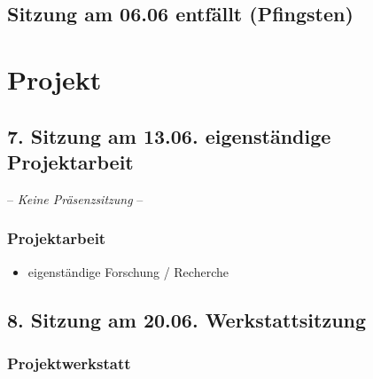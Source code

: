 \documentclass[
  ngerman,
]{article}
\providecommand{\tightlist}{%
  \setlength{\itemsep}{0pt}\setlength{\parskip}{0pt}}
\begin{document}
\hypertarget{sitzung-am-06.06-entfuxe4llt-pfingsten}{%
\subsection*{Sitzung am 06.06 entfällt (Pfingsten)}\label{sitzung-am-06.06-entfuxe4llt-pfingsten}}

\hypertarget{projekt}{%
\section*{Projekt}\label{projekt}}

\hypertarget{sitzung-am-13.06.-eigenstuxe4ndige-projektarbeit}{%
\subsection*{7. Sitzung am 13.06. \textbar{} eigenständige Projektarbeit}\label{sitzung-am-13.06.-eigenstuxe4ndige-projektarbeit}}

-- \emph{Keine Präsenzsitzung} --

\hypertarget{projektarbeit-5}{%
\subsubsection*{Projektarbeit}\label{projektarbeit-5}}

\begin{itemize}
\tightlist
\item
  eigenständige Forschung / Recherche
\end{itemize}

\hypertarget{sitzung-am-20.06.-werkstattsitzung}{%
\subsection*{8. Sitzung am 20.06. \textbar{} Werkstattsitzung}\label{sitzung-am-20.06.-werkstattsitzung}}

\hypertarget{projektwerkstatt}{%
\subsubsection*{Projektwerkstatt}\label{projektwerkstatt}}
\end{document}
